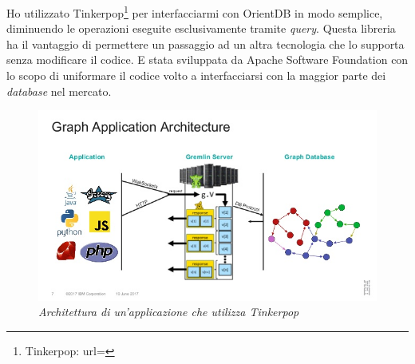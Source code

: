 Ho utilizzato Tinkerpop\footnote{Tinkerpop: url= } per interfacciarmi con OrientDB in modo semplice, diminuendo le operazioni eseguite esclusivamente tramite \textit{query}. Questa libreria ha il vantaggio di permettere un passaggio ad un altra tecnologia che lo supporta senza modificare il codice. E stata sviluppata da Apache Software Foundation con lo scopo di uniformare il codice volto a interfacciarsi con la maggior parte dei \textit{database} nel mercato.
\begin{figure}[h!]
	\centering
	\includegraphics[scale=0.65]{immagini/tinkerpop.jpg}
	\caption{\textit{Architettura di un'applicazione che utilizza Tinkerpop} }
\end{figure}


